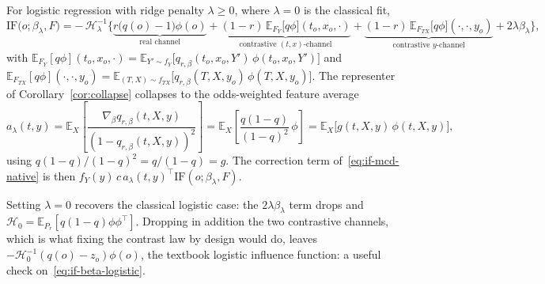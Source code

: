 \documentclass[11pt]{article}
\newcommand{\Eb}{\mathbb{E}}
\newcommand{\IF}{\mathrm{IF}}
\newcommand{\Hb}{\mathcal{H}}
\begin{document}
\begin{keyresult}
For logistic regression with ridge penalty $\lambda\ge0$, where $\lambda=0$ is the
classical fit,
\begin{equation}
\IF\big(o;\beta_\lambda,F\big)
= -\,\Hb_\lambda^{-1}\Big\{
\underbrace{r\big(q(o)-1\big)\phi(o)}_{\text{real channel}}
+\underbrace{(1-r)\,\Eb_{F_Y}\!\big[q\phi\big](t_o,x_o,\cdot)}_{\text{contrastive }(t,x)\text{-channel}}
+\underbrace{(1-r)\,\Eb_{F_{TX}}\!\big[q\phi\big](\cdot,\cdot,y_o)}_{\text{contrastive }y\text{-channel}}
+2\lambda\beta_\lambda\Big\},
\label{eq:if-beta-logistic}
\end{equation}
with
$\Eb_{F_Y}[q\phi](t_o,x_o,\cdot)=\Eb_{Y'\sim f_Y}\big[q_{r,\beta}(t_o,x_o,Y')\,\phi(t_o,x_o,Y')\big]$
and
$\Eb_{F_{TX}}[q\phi](\cdot,\cdot,y_o)=\Eb_{(T,X)\sim f_{TX}}\big[q_{r,\beta}(T,X,y_o)\,\phi(T,X,y_o)\big]$.
The representer of Corollary~\ref{cor:collapse} collapses to the odds-weighted feature
average
\begin{equation}
a_\lambda(t,y)
= \Eb_X\!\left[\frac{\nabla_\beta q_{r,\beta}(t,X,y)}{(1-q_{r,\beta}(t,X,y))^2}\right]
= \Eb_X\!\left[\frac{q(1-q)}{(1-q)^2}\,\phi\right]
= \Eb_X\big[g(t,X,y)\,\phi(t,X,y)\big],
\label{eq:a-logistic}
\end{equation}
using $q(1-q)/(1-q)^2=q/(1-q)=g$. The correction term of~\eqref{eq:if-mcd-native} is
then $f_Y(y)\,c\,a_\lambda(t,y)^\top\IF(o;\beta_\lambda,F)$.
\end{keyresult}

Setting $\lambda=0$ recovers the classical logistic case: the $2\lambda\beta_\lambda$
term drops and $\Hb_0=\Eb_{P_r}[q(1-q)\phi\phi^\top]$. Dropping in addition the two
contrastive channels, which is what fixing the contrast law by design would do,
leaves $-\Hb_0^{-1}(q(o)-z_o)\phi(o)$, the textbook logistic influence function: a
useful check on~\eqref{eq:if-beta-logistic}.
\end{document}
